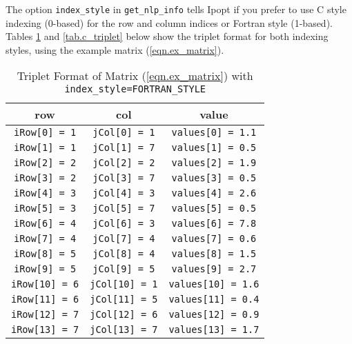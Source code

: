 \documentclass[letter,10pt]{article}
\begin{document}
The option {\tt index\_style} in {\tt get\_nlp\_info} tells Ipopt if
you prefer to use C style indexing (0-based) for the row and column
indices or Fortran style (1-based). Tables \ref{tab.fortran_triplet} and 
\ref{tab.c_triplet} below show the triplet
format for both indexing styles, using the example matrix (\ref{eqn.ex_matrix}).

\begin{footnotesize}
\begin{table}[h]%
\begin{center}
\caption{Triplet Format of Matrix (\ref{eqn.ex_matrix}) 
with {\tt index\_style=FORTRAN\_STYLE}}
\label{tab.fortran_triplet}
\begin{tabular}{c c c}
row     		&       col     	&       value 			    \\
\hline
{\tt iRow[0] = 1}       &       {\tt jCol[0] = 1}       & {\tt values[0] = 1.1}     \\
{\tt iRow[1] = 1}       &       {\tt jCol[1] = 7}       & {\tt values[1] = 0.5}     \\
{\tt iRow[2] = 2}       &       {\tt jCol[2] = 2}       & {\tt values[2] = 1.9}     \\
{\tt iRow[3] = 2}       &       {\tt jCol[3] = 7}       & {\tt values[3] = 0.5}     \\
{\tt iRow[4] = 3}       &       {\tt jCol[4] = 3}       & {\tt values[4] = 2.6}     \\
{\tt iRow[5] = 3}       &       {\tt jCol[5] = 7}       & {\tt values[5] = 0.5}     \\
{\tt iRow[6] = 4}       &       {\tt jCol[6] = 3}       & {\tt values[6] = 7.8}     \\
{\tt iRow[7] = 4}       &       {\tt jCol[7] = 4}       & {\tt values[7] = 0.6}     \\
{\tt iRow[8] = 5}       &       {\tt jCol[8] = 4}       & {\tt values[8] = 1.5}     \\
{\tt iRow[9] = 5}       &       {\tt jCol[9] = 5}       & {\tt values[9] = 2.7}     \\
{\tt iRow[10] = 6}      &       {\tt jCol[10] = 1}      & {\tt values[10] = 1.6}     \\
{\tt iRow[11] = 6}      &       {\tt jCol[11] = 5}      & {\tt values[11] = 0.4}     \\
{\tt iRow[12] = 7}      &       {\tt jCol[12] = 6}      & {\tt values[12] = 0.9}     \\
{\tt iRow[13] = 7}      &       {\tt jCol[13] = 7}      & {\tt values[13] = 1.7}
\end{tabular}

\end{center}
\end{table}
\end{footnotesize}
\end{document}
